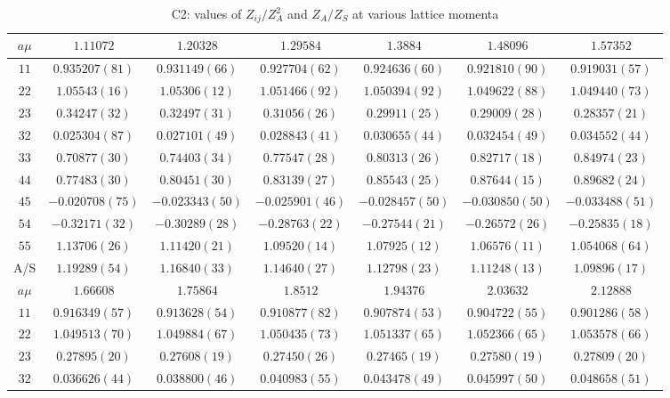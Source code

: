 \begin{table}
\begin{center}
\caption{C2: values of $Z_{ij}/Z_A^2$ and $Z_A/Z_S$ at various lattice momenta}
\begin{tabular}{c|c c c c c c}
\hline
\hline
$a\mu$ & $1.11072$ & $1.20328$ & $1.29584$ & $1.3884$ & $1.48096$ & $1.57352$ \\
\hline
$11$ & $0.935207(81)$ & $0.931149(66)$ & $0.927704(62)$ & $0.924636(60)$ & $0.921810(90)$ & $0.919031(57)$ \\
$22$ & $1.05543(16)$ & $1.05306(12)$ & $1.051466(92)$ & $1.050394(92)$ & $1.049622(88)$ & $1.049440(73)$ \\
$23$ & $0.34247(32)$ & $0.32497(31)$ & $0.31056(26)$ & $0.29911(25)$ & $0.29009(28)$ & $0.28357(21)$ \\
$32$ & $0.025304(87)$ & $0.027101(49)$ & $0.028843(41)$ & $0.030655(44)$ & $0.032454(49)$ & $0.034552(44)$ \\
$33$ & $0.70877(30)$ & $0.74403(34)$ & $0.77547(28)$ & $0.80313(26)$ & $0.82717(18)$ & $0.84974(23)$ \\
$44$ & $0.77483(30)$ & $0.80451(30)$ & $0.83139(27)$ & $0.85543(25)$ & $0.87644(15)$ & $0.89682(24)$ \\
$45$ & $-0.020708(75)$ & $-0.023343(50)$ & $-0.025901(46)$ & $-0.028457(50)$ & $-0.030850(50)$ & $-0.033488(51)$ \\
$54$ & $-0.32171(32)$ & $-0.30289(28)$ & $-0.28763(22)$ & $-0.27544(21)$ & $-0.26572(26)$ & $-0.25835(18)$ \\
$55$ & $1.13706(26)$ & $1.11420(21)$ & $1.09520(14)$ & $1.07925(12)$ & $1.06576(11)$ & $1.054068(64)$ \\
\hline
A/S & $1.19289(54)$ & $1.16840(33)$ & $1.14640(27)$ & $1.12798(23)$ & $1.11248(13)$ & $1.09896(17)$ \\
\hline
$a\mu$ & $1.66608$ & $1.75864$ & $1.8512$ & $1.94376$ & $2.03632$ & $2.12888$ \\
\hline
$11$ & $0.916349(57)$ & $0.913628(54)$ & $0.910877(82)$ & $0.907874(53)$ & $0.904722(55)$ & $0.901286(58)$ \\
$22$ & $1.049513(70)$ & $1.049884(67)$ & $1.050435(73)$ & $1.051337(65)$ & $1.052366(65)$ & $1.053578(66)$ \\
$23$ & $0.27895(20)$ & $0.27608(19)$ & $0.27450(26)$ & $0.27465(19)$ & $0.27580(19)$ & $0.27809(20)$ \\
$32$ & $0.036626(44)$ & $0.038800(46)$ & $0.040983(55)$ & $0.043478(49)$ & $0.045997(50)$ & $0.048658(51)$ \\

\end{tabular}
\end{center}
\end{table}
